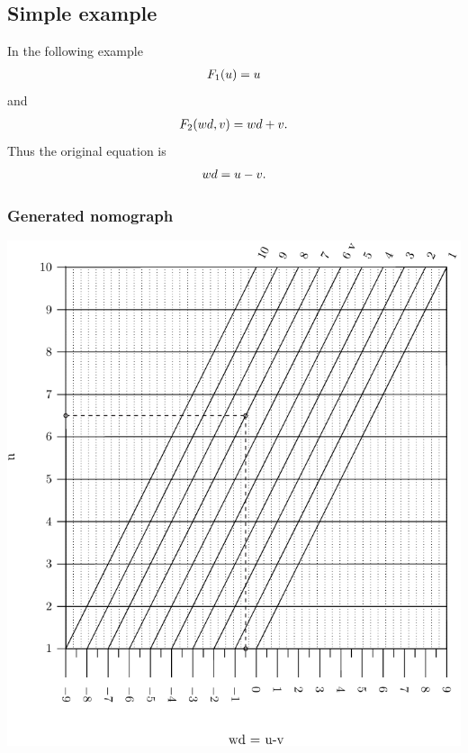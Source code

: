 \documentclass[a4paper,11pt,english]{sphinxmanual}
\begin{document}
\subsection{Simple example}
\label{types/types:id27}
In the following example
\begin{gather}
\begin{split}F_1(u)=u\end{split}\notag
\end{gather}
and
\begin{gather}
\begin{split}F_2(wd,v)=wd+v.\end{split}\notag
\end{gather}
Thus the original equation is
\begin{gather}
\begin{split}wd=u-v.\end{split}\notag
\end{gather}

\subsubsection{Generated nomograph}
\label{types/types:id28}
\includegraphics{ex_type5_nomo_1.pdf}
\end{document}
